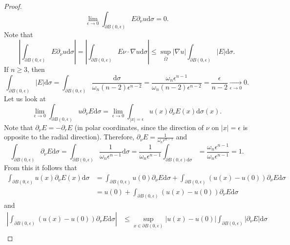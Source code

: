 \documentclass[11pt]{article}
\begin{document}
\begin{proof}
					\begin{equation*}
						\lim_{\epsilon\to 0}\int_{\partial B(0,\epsilon)}E\partial_\nu u\mathrm{d}\sigma=0.
					\end{equation*}
					Note that
					\begin{equation*}
						|\int_{\partial B(0,\epsilon)}E\partial_\nu u\mathrm{d}\sigma|=|\int_{\partial B(0,\epsilon)}E\nu\cdot\nabla u\mathrm{d}\sigma|\le\sup_{\bar{\Omega}}|\nabla u|\int_{\partial B(0,\epsilon)}|E|\mathrm{d}\sigma.
					\end{equation*}
					If $n\ge3$, then
					\begin{equation*}
						\int_{\partial B(0,\epsilon)}|E|\mathrm{d}\sigma=\int_{\partial B(0,\epsilon)}\frac{\mathrm{d}\sigma}{\omega_n(n-2)\epsilon^{n-2}}=\frac{\omega_n\epsilon^{n-1}}{\omega_n(n-2)\epsilon^{n-2}}=\frac{\epsilon}{n-2}\underset{\epsilon\to0}{\longrightarrow}0.	
					\end{equation*}
					Let us look at 
					\begin{equation*}
						\lim_{\epsilon\to0}\int_{\partial B(0,\epsilon)}u\partial_\nu E\mathrm{d}\sigma=\lim_{\epsilon\to0}\int_{|x|=\epsilon}u(x)\partial_\nu E(x)\mathrm{d}\sigma(x).
					\end{equation*}
					Note that $\partial_\nu E=-\partial_r E$ (in polar coordinates, since the direction of $\nu$ on $|x|=\epsilon$ is opposite to the radial direction). Therefore, $\partial_\nu E=\frac{1}{\omega_n r^{n-1}}$ and 
					\begin{equation*}
						\int_{\partial B(0,\epsilon)}\partial_\nu E\mathrm{d}\sigma=\int_{\partial B(0,\epsilon)}\frac{1}{\omega_n\epsilon^{n-1}}\mathrm{d}\sigma=\frac{1}{\omega_n\epsilon^{n-1}}\int_{\partial B(0,\epsilon)\mathrm{d}\sigma}=\frac{\omega_n\epsilon^{n-1}}{\omega_n\epsilon^{n-1}}=1.
					\end{equation*}
					From this it follows that
					\begin{align*}
						\int_{\partial B(0,\epsilon)}u(x)\partial_\nu E(x)\mathrm{d}\sigma&=\int_{\partial B(0,\epsilon)}u(0)\partial_\nu E \mathrm{d}\sigma+\int_{\partial B(0,\epsilon)}(u(x)-u(0))\partial_\nu E \mathrm{d}\sigma\\
						&=u(0)+\int_{\partial B(0,\epsilon)}(u(x)-u(0))\partial_\nu E \mathrm{d}\sigma
					\end{align*}
					and
					\begin{align*}
						|\int_{\partial B(0,\epsilon)}(u(x)-u(0))\partial_\nu E \mathrm{d}\sigma|&\le\sup_{x\in\partial B(0,\epsilon)}|u(x)-u(0)|\int_{\partial B(0,\epsilon)}|\partial_\nu E|\mathrm{d}\sigma\\

\end{align*}
\end{proof}
\end{document}
